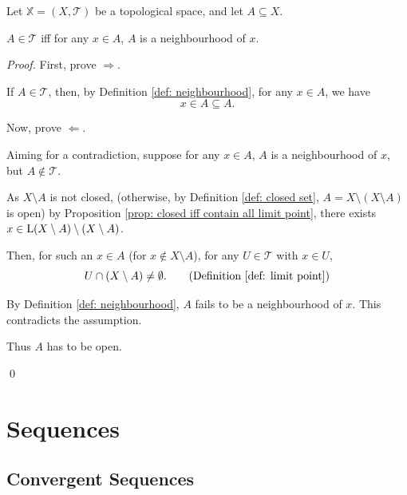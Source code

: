 \begin{proposition}
	Let $\mathbb X = (X, \mathcal T)$ be a topological space, and let $A \subseteq X$.
	
	$A \in \mathcal T$ iff for any $x \in A$, $A$ is a neighbourhood of $x$.
	
	\begin{proof}
		First, prove $\Rightarrow$.
		
		If $A \in \mathcal T$, then, by Definition \ref{def: neighbourhood}, for any $x \in A$, we have
		$$
		x \in A \subseteq A.
		$$
		
		\qedlm
		
		Now, prove $\Leftarrow$.
		
		Aiming for a contradiction, suppose for any $x \in A$, $A$ is a neighbourhood of $x$, but $A\notin \mathcal T$.
		
		As $X \setminus A$ is not closed, (otherwise, by Definition \ref{def: closed set}, $A = X \setminus (X \setminus A)$ is open) by Proposition \ref{prop: closed iff contain all limit point}, there exists $x \in \mathrm{L}(X \setminus A) \setminus (X \setminus A)$.
		
		Then, for such an $x \in A$ (for $x \notin X \setminus A$), for any $U \in \mathcal T$ with $x \in U$,
		$$
		U \cap (X \setminus A) \ne \emptyset. \qquad \text{(Definition \ref{def: limit point})}
		$$
		
		By Definition \ref{def: neighbourhood}, $A$ fails to be a neighbourhood of $x$. This contradicts the assumption.
		
		Thus $A$ has to be open.
		
		\qed
	\end{proof}
\end{proposition}


\chapter{Sequences}


\section{Convergent Sequences}


